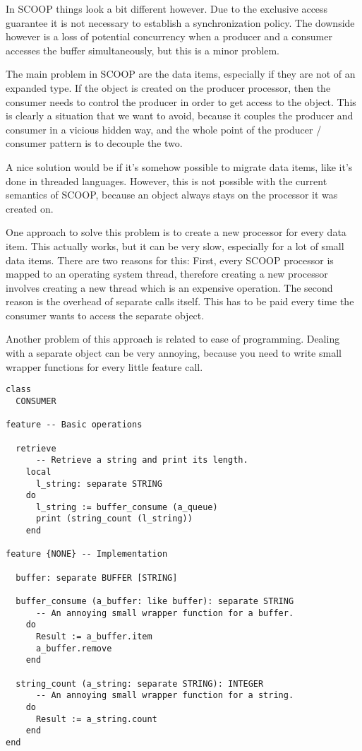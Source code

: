\documentclass[a4paper,10pt]{report}
\begin{document}
In SCOOP things look a bit different however.
Due to the exclusive access guarantee it is not necessary to establish a synchronization policy.
The downside however is a loss of potential concurrency when a producer and a consumer accesses the buffer simultaneously, but this is a minor problem.

The main problem in SCOOP are the data items, especially if they are not of an expanded type.
If the object is created on the producer processor, then the consumer needs to control the producer in order to get access to the object.
This is clearly a situation that we want to avoid, because it couples the producer and consumer in a vicious hidden way, and the whole point of the producer / consumer pattern is to decouple the two.

A nice solution would be if it's somehow possible to migrate data items, like it's done in threaded languages.
However, this is not possible with the current semantics of SCOOP, because an object always stays on the processor it was created on.

One approach to solve this problem is to create a new processor for every data item.
This actually works, but it can be very slow, especially for a lot of small data items.
There are two reasons for this:
First, every SCOOP processor is mapped to an operating system thread, therefore creating a new processor involves creating a new thread which is an expensive operation.
The second reason is the overhead of separate calls itself.
This has to be paid every time the consumer wants to access the separate object.

Another problem of this approach is related to ease of programming.
Dealing with a separate object can be very annoying, because you need to write small wrapper functions for every little feature call.

\begin{lstlisting}
class
  CONSUMER

feature -- Basic operations
  
  retrieve
      -- Retrieve a string and print its length.
    local
      l_string: separate STRING
    do
      l_string := buffer_consume (a_queue)
      print (string_count (l_string))
    end
    
feature {NONE} -- Implementation
  
  buffer: separate BUFFER [STRING]

  buffer_consume (a_buffer: like buffer): separate STRING
      -- An annoying small wrapper function for a buffer.
    do
      Result := a_buffer.item
      a_buffer.remove
    end
    
  string_count (a_string: separate STRING): INTEGER
      -- An annoying small wrapper function for a string.
    do
      Result := a_string.count
    end
end
\end{lstlisting}
\end{document}
